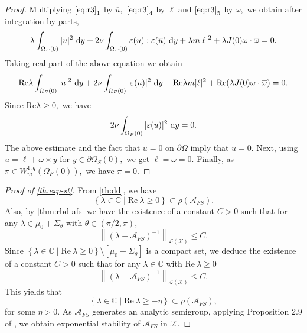 \documentclass[12pt,a4paper,reqno]{amsart}
\theoremstyle{definition}
\theoremstyle{remark}
\numberwithin{equation}{section}
\newcommand{\oso}{\Omega_{S}(0)}
\newcommand{\ofo}{\Omega_{F}(0)}
\newcommand{\ds}{\displaystyle}
\newcommand{\poso}{\partial\oso}
\newcommand{\mx}{\mathcal{X}}
\begin{document}
\begin{proof}
Multiplying $\eqref{eq:r3}_{1}$ by $\overline{u},$ $\eqref{eq:r3}_{4}$ by $\overline \ell$ and $\eqref{eq:r3}_{5}$ by $\overline \omega,$ we obtain after integration by parts,
\begin{align*}
\lambda \int_{\ofo} |u|^{2} \ {\rm d} y+ 2\nu \int_{\ofo} \varepsilon(u) : \varepsilon(\overline u) \ {\rm d} y + \lambda m |\ell|^{2} + \lambda J(0)\omega \cdot \overline \omega = 0.
\end{align*}
Taking real part of the above equation we obtain
\begin{align*}
\mathrm{Re}\lambda \int_{\ofo} |u|^{2} \ {\rm d} y + 2\nu \int_{\ofo} |\varepsilon(u)|^{2} \ {\rm d} y  + \mathrm{Re}\lambda m |\ell|^{2} + \mathrm{Re}(\lambda J(0)\omega \cdot \overline \omega )= 0.
\end{align*}
Since $\mathrm{Re} \lambda \geqslant 0,$ we have
\begin{equation*}
2\nu \int_{\ofo} |\varepsilon(u)|^{2} \ {\rm d} y = 0.
\end{equation*}
The above estimate and the fact that $u = 0$ on $\partial\Omega$ imply that $u = 0.$ Next, using $u = \ell + \omega \times y$ for $y \in \poso,$ we get $\ell = \omega = 0.$ Finally, as  $\pi \in W^{1,q}_{m}(\ofo),$ we have $\pi = 0.$
\end{proof}

\begin{proof}[Proof of \cref{th:exp-st}]
From \cref{th:dd}, we have
\begin{equation*}
\left\{ \lambda \in \mathbb{C} \mid \mathrm{Re} \ \lambda \geqslant 0\right\} \subset \rho(\mathcal{A}_{FS}).
\end{equation*}
Also, by \cref{thm:rbd-afs} we have the existence of a constant $C > 0$ such that for any $\lambda \in \mu_{0} + \Sigma_{\theta}$ with $\theta \in (\pi/2,\pi),$
\begin{equation*}
\left\|\left(\lambda - \mathcal{A}_{FS} \right)^{-1} \right\|_{\mathcal{L}(\mx)} \leqslant C.
\end{equation*}
Since $\ds \left\{\lambda \in \mathbb{C} \mid \mathrm{Re} \ \lambda \geqslant 0  \right\} \setminus [\mu_{0} + \Sigma_{\theta}]$ is a compact set, we deduce the existence of a constant $C > 0$ such that for any $\lambda \in \mathbb{C}$ with $\mathrm{Re} \ \lambda \geqslant 0$
\begin{equation*}
\left\|\left(\lambda - \mathcal{A}_{FS} \right)^{-1} \right\|_{\mathcal{L}(\mx)} \leqslant C.
\end{equation*}
 This yields that
\begin{equation*}
\left\{\lambda \in \mathbb{C} \mid \mathrm{Re} \ \lambda \geqslant - \eta \right\} \subset \rho(\mathcal{A}_{FS}),
\end{equation*}
for some $\eta > 0.$ As $\mathcal{A}_{FS}$ generates an analytic semigroup, applying Proposition 2.9 of  \cite[Part II, Chapter 1, pp 120]{BDDM}, we obtain exponential stability of $\mathcal{A}_{FS}$ in $\mx.$
\end{proof}
\end{document}
